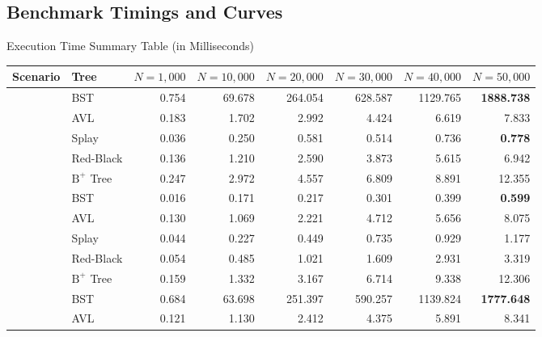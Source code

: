 \documentclass[aspectratio=169, 10pt, xcolor={x11names}]{beamer}
\begin{document}
\subsection{Benchmark Timings and Curves}
\begin{frame}{Execution Time Summary Table (in Milliseconds)}
\centering
\renewcommand{\arraystretch}{0.92}
\setlength{\tabcolsep}{5pt}
\tiny
\begin{tabular}{@{}llrrrrrr@{}}
\toprule
\textbf{\color{primary}Scenario} & \textbf{\color{primary}Tree} & \textbf{\color{primary}$N=1{,}000$} & \textbf{\color{primary}$N=10{,}000$} & \textbf{\color{primary}$N=20{,}000$} & \textbf{\color{primary}$N=30{,}000$} & \textbf{\color{primary}$N=40{,}000$} & \textbf{\color{primary}$N=50{,}000$} \\
\midrule
{}
  & BST       & 0.754 & 69.678 & 264.054 & 628.587 & 1129.765 & \textbf{\color{Red3}1888.738} \\
  & AVL       & 0.183 &  1.702 &   2.992 &   4.424 &    6.619 &    7.833 \\
  & Splay     & 0.036 &  0.250 &   0.581 &   0.514 &    0.736 & \textbf{\color{progcolor}0.778} \\
  & Red-Black & 0.136 &  1.210 &   2.590 &   3.873 &    5.615 &    6.942 \\
  & $\text{B}^+$ Tree & 0.247 &  2.972 &   4.557 &   6.809 &    8.891 &   12.355 \\
\midrule
{}
  & BST       & 0.016 &  0.171 &   0.217 &   0.301 &    0.399 & \textbf{\color{progcolor}0.599} \\
  & AVL       & 0.130 &  1.069 &   2.221 &   4.712 &    5.656 &    8.075 \\
  & Splay     & 0.044 &  0.227 &   0.449 &   0.735 &    0.929 &    1.177 \\
  & Red-Black & 0.054 &  0.485 &   1.021 &   1.609 &    2.931 &    3.319 \\
  & $\text{B}^+$ Tree & 0.159 &  1.332 &   3.167 &   6.714 &    9.338 &   12.306 \\
\midrule
{}
  & BST       & 0.684 & 63.698 & 251.397 & 590.257 & 1139.824 & \textbf{\color{Red3}1777.648} \\
  & AVL       & 0.121 &  1.130 &   2.412 &   4.375 &    5.891 &    8.341 \\

\end{tabular}
\end{frame}
\end{document}
